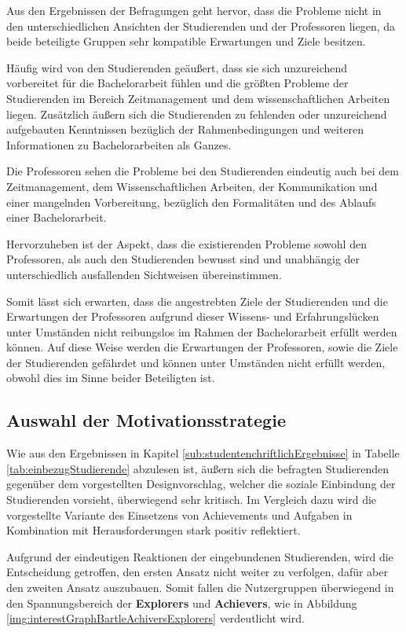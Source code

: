 \documentclass{scrreprt}
\begin{document}
\par \bigskip Aus den Ergebnissen der Befragungen geht hervor, dass die Probleme nicht in den unterschiedlichen Ansichten der Studierenden und der Professoren liegen, da beide beteiligte Gruppen sehr kompatible Erwartungen und Ziele besitzen.

\par\medskip Häufig wird von den Studierenden geäußert, dass sie sich unzureichend vorbereitet für die Bachelorarbeit fühlen und die größten Probleme der Studierenden im Bereich Zeitmanagement und dem wissenschaftlichen Arbeiten liegen. Zusätzlich äußern sich die Studierenden zu fehlenden oder unzureichend aufgebauten Kenntnissen bezüglich der Rahmenbedingungen und weiteren Informationen zu Bachelorarbeiten als Ganzes.

\par\medskip Die Professoren sehen die Probleme bei den Studierenden eindeutig auch bei dem Zeitmanagement, dem Wissenschaftlichen Arbeiten, der Kommunikation und einer mangelnden Vorbereitung, bezüglich den Formalitäten und des Ablaufs einer Bachelorarbeit.

\par\medskip Hervorzuheben ist der Aspekt, dass die existierenden Probleme sowohl den Professoren, als auch den Studierenden bewusst sind und unabhängig der unterschiedlich ausfallenden Sichtweisen übereinstimmen.

\par\medskip Somit lässt sich erwarten, dass die angestrebten Ziele der Studierenden und die Erwartungen der Professoren aufgrund dieser Wissens- und Erfahrungslücken unter Umständen nicht reibungslos im Rahmen der Bachelorarbeit erfüllt werden können. Auf diese Weise werden die Erwartungen der Professoren, sowie die Ziele der Studierenden gefährdet und können unter Umständen nicht erfüllt werden, obwohl dies im Sinne beider Beteiligten ist.

\subsection{Auswahl der Motivationsstrategie}
\par Wie aus den Ergebnissen in Kapitel \ref{sub:studentenchriftlichErgebnisse} in Tabelle \ref{tab:einbezugStudierende} abzulesen ist, äußern sich die befragten Studierenden gegenüber dem vorgestellten Designvorschlag, welcher die soziale Einbindung der Studierenden vorsieht, überwiegend sehr kritisch. Im Vergleich dazu wird die vorgestellte Variante des Einsetzens von Achievements und Aufgaben in Kombination mit Herausforderungen stark positiv reflektiert.
\par Aufgrund der eindeutigen Reaktionen der eingebundenen Studierenden, wird die Entscheidung getroffen, den ersten Ansatz nicht weiter zu verfolgen, dafür aber den zweiten Ansatz auszubauen. Somit fallen die Nutzergruppen überwiegend in den Spannungsbereich der \textbf{Explorers} und \textbf{Achievers}, wie in Abbildung \ref{img:interestGraphBartleAchiversExplorers} verdeutlicht wird. 
\end{document}
